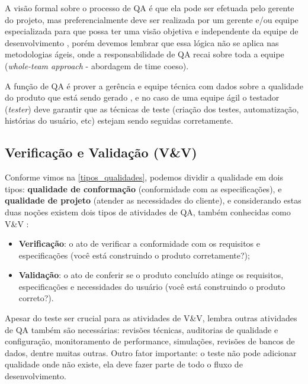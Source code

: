 \documentclass[
	12pt,				%
	openright,			%
	oneside,			%
	a4paper,			%
	english,			%
	brazil,				%
	]{abntex2}
\begin{document}
A visão formal sobre o processo de QA é que ela pode ser efetuada pelo gerente do projeto, mas preferencialmente deve ser realizada por um gerente e/ou equipe especializada para que possa ter uma visão objetiva e independente da equipe de desenvolvimento \cite{SOMMERVILLE2011,WAZLAWICK2013}, porém devemos lembrar que essa lógica não se aplica nas metodologias ágeis, onde a responsabilidade de QA recai sobre toda a equipe (\emph{whole-team approach} - abordagem de time coeso).

A função de QA é prover a gerência e equipe técnica com dados sobre a qualidade do produto que está sendo gerado \cite{SOMMERVILLE2011}, e no caso de uma equipe ágil o testador (\emph{tester}) deve garantir que as técnicas de teste (criação dos testes, automatização, histórias do usuário, etc) estejam sendo seguidas corretamente.

\subsection{Verificação e Validação (V\&V)}
Conforme vimos na \autoref{tipos_qualidades}, podemos dividir a qualidade em dois tipos: \textbf{qualidade de conformação} (conformidade com as especificações), e \textbf{qualidade de projeto} (atender as necessidades do cliente), e considerando estas duas noções existem dois tipos de atividades de QA, também conhecidas como V\&V \cite{tsui2013, PRESSMAN2010}:
\begin{itemize}
    \item \textbf{Verificação}: o ato de verificar a conformidade com os requisitos e especificações (você está construindo o produto corretamente?);
    \item \textbf{Validação}: o ato de conferir se o produto concluído atinge os requisitos, especificações e necessidades do usuário (você está construindo o produto correto?).
\end{itemize}

Apesar do teste ser crucial para as atividades de V\&V,  lembra outras atividades de QA também são necessárias: revisões técnicas, auditorias de qualidade e configuração, monitoramento de performance, simulações, revisões de bancos de dados, dentre muitas outras. Outro fator importante: o teste não pode adicionar qualidade onde não existe, ela deve fazer parte de todo o fluxo de desenvolvimento.

\end{document}
